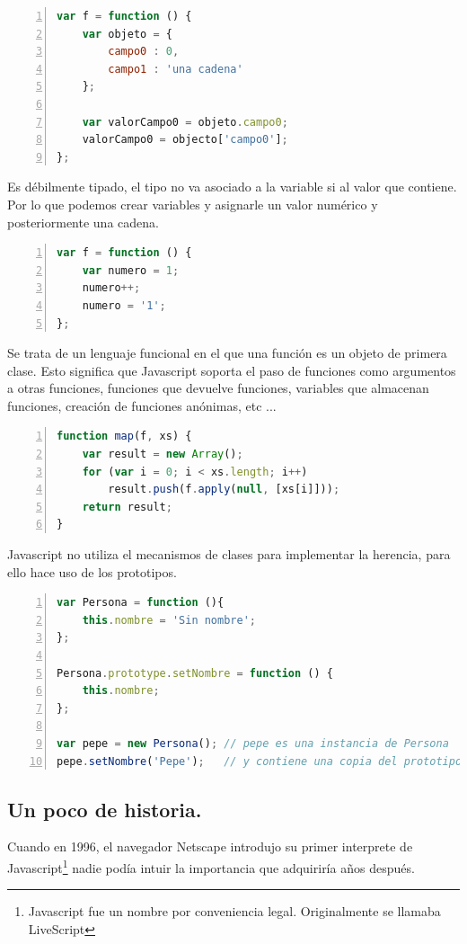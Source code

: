 \begin{lstlisting}[language=JavaScript, numbers=left]
var f = function () {
	var objeto = { 
		campo0 : 0,
		campo1 : 'una cadena' 
	};
	
	var valorCampo0 = objeto.campo0;
	valorCampo0 = objecto['campo0'];
};
\end{lstlisting}

Es débilmente tipado, el tipo no va asociado a la variable si al valor que contiene. Por lo que podemos crear variables y asignarle un valor numérico y posteriormente una cadena. 

\begin{lstlisting}[language=JavaScript, numbers=left]
var f = function () {
	var numero = 1;
	numero++;
	numero = '1';
};
\end{lstlisting}

Se trata de un lenguaje funcional en el que una función es un objeto de primera clase. Esto significa que Javascript soporta el paso de funciones como argumentos a otras funciones, funciones que devuelve funciones, variables que almacenan funciones, creación de funciones anónimas, etc ...

\begin{lstlisting}[language=JavaScript, numbers=left]
function map(f, xs) {
	var result = new Array();
	for (var i = 0; i < xs.length; i++)
		result.push(f.apply(null, [xs[i]]));
	return result;
}
\end{lstlisting}

Javascript no utiliza el mecanismos de clases para implementar la herencia, para ello hace uso de los prototipos. 

\begin{lstlisting}[language=JavaScript, numbers=left]
var Persona = function (){
	this.nombre = 'Sin nombre';
};

Persona.prototype.setNombre = function () {
	this.nombre;
};

var pepe = new Persona(); // pepe es una instancia de Persona 
pepe.setNombre('Pepe');   // y contiene una copia del prototipo de Persona.
\end{lstlisting}


\subsection{Un poco de historia.}

Cuando en 1996, el navegador Netscape introdujo su primer interprete de
Javascript\footnote{Javascript fue un nombre por conveniencia legal. Originalmente se llamaba
  LiveScript} nadie podía intuir la importancia que adquiriría años después. 

